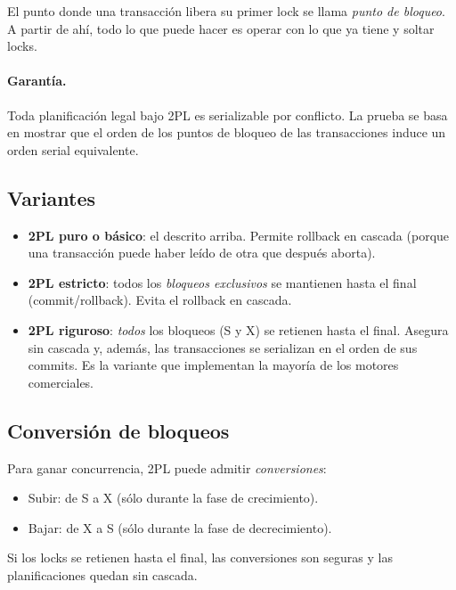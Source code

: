 \documentclass[11pt,a4paper]{article}
\begin{document}
El punto donde una transacción libera su primer lock se llama
\emph{punto de bloqueo}. A partir de ahí, todo lo que puede hacer es
operar con lo que ya tiene y soltar locks.

\paragraph{Garantía.} Toda planificación legal bajo 2PL es serializable
por conflicto. La prueba se basa en mostrar que el orden de los puntos
de bloqueo de las transacciones induce un orden serial equivalente.

\subsection{Variantes}

\begin{itemize}
    \item \textbf{2PL puro o básico}: el descrito arriba. Permite
    rollback en cascada (porque una transacción puede haber leído de
    otra que después aborta).
    \item \textbf{2PL estricto}: todos los \emph{bloqueos exclusivos} se
    mantienen hasta el final (commit/rollback). Evita el rollback en
    cascada.
    \item \textbf{2PL riguroso}: \emph{todos} los bloqueos (S y X) se
    retienen hasta el final. Asegura sin cascada y, además, las
    transacciones se serializan en el orden de sus commits. Es la
    variante que implementan la mayoría de los motores comerciales.
\end{itemize}

\subsection{Conversión de bloqueos}

Para ganar concurrencia, 2PL puede admitir \emph{conversiones}:

\begin{itemize}
    \item Subir: de S a X (sólo durante la fase de crecimiento).
    \item Bajar: de X a S (sólo durante la fase de decrecimiento).
\end{itemize}

Si los locks se retienen hasta el final, las conversiones son seguras y
las planificaciones quedan sin cascada.

\end{document}
